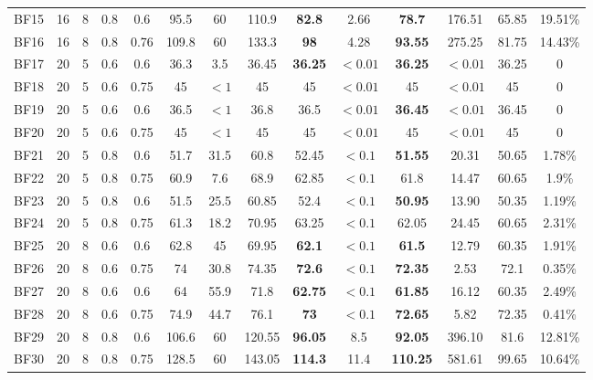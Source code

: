 \documentclass[review,3p,times,authoryear,12pt]{elsarticle}
\begin{document}
\begin{table}[htbp]
\begin{tabular}{c|c|c|c|c|c|c|c|c|c|c|c|c|c}
    BF15  & 16 & 8  & 0.8 & 0.6  & 95.5  & 60    & 110.9  & \textbf{82.8} & 2.66    & \textbf{78.7}  & 176.51  & 65.85 & 19.51\%\\
    BF16  & 16 & 8  & 0.8 & 0.76 & 109.8 & 60    & 133.3  & \textbf{98}   & 4.28    & \textbf{93.55} & 275.25  & 81.75 & 14.43\%\\
    BF17  & 20 & 5  & 0.6 & 0.6  & 36.3  & 3.5   & 36.45  & \textbf{36.25}& $<0.01$ & \textbf{36.25} & $<0.01$ & 36.25 & 0\\
    BF18  & 20 & 5  & 0.6 & 0.75 & 45    & $<1$  & 45     & 45            & $<0.01$ & 45             & $<0.01$ & 45    & 0\\
    BF19  & 20 & 5  & 0.6 & 0.6  & 36.5  & $<1$  & 36.8   & 36.5          & $<0.01$ & \textbf{36.45} & $<0.01$ & 36.45 & 0\\
    BF20  & 20 & 5  & 0.6 & 0.75 & 45    & $<1$  & 45     & 45            & $<0.01$ & 45             & $<0.01$ & 45    & 0\\
    BF21  & 20 & 5  & 0.8 & 0.6  & 51.7  & 31.5  & 60.8   & 52.45         & $<0.1$  & \textbf{51.55} & 20.31   & 50.65 & 1.78\%\\
    BF22  & 20 & 5  & 0.8 & 0.75 & 60.9  & 7.6   & 68.9   & 62.85         & $<0.1$  & 61.8           & 14.47   & 60.65 & 1.9\%\\
    BF23  & 20 & 5  & 0.8 & 0.6  & 51.5  & 25.5  & 60.85  & 52.4          & $<0.1$  & \textbf{50.95} & 13.90   & 50.35 & 1.19\%\\
    BF24  & 20 & 5  & 0.8 & 0.75 & 61.3  & 18.2  & 70.95  & 63.25         & $<0.1$  & 62.05          & 24.45   & 60.65 & 2.31\%\\
    BF25  & 20 & 8  & 0.6 & 0.6  & 62.8  & 45    & 69.95  & \textbf{62.1} & $<0.1$  & \textbf{61.5}  & 12.79   & 60.35 & 1.91\%\\
    BF26  & 20 & 8  & 0.6 & 0.75 & 74    & 30.8  & 74.35  & \textbf{72.6} & $<0.1$  & \textbf{72.35} & 2.53    & 72.1  & 0.35\%\\
    BF27  & 20 & 8  & 0.6 & 0.6  & 64    & 55.9  & 71.8   & \textbf{62.75}& $<0.1$  & \textbf{61.85} & 16.12   & 60.35 & 2.49\%\\
    BF28& 20 & 8  & 0.6 & 0.75 & 74.9  & 44.7  & 76.1   & \textbf{73}   & $<0.1$  & \textbf{72.65} & 5.82    & 72.35 & 0.41\%\\
    BF29  & 20 & 8  & 0.8 & 0.6  & 106.6 & 60    & 120.55 & \textbf{96.05}& 8.5     & \textbf{92.05} & 396.10  & 81.6  & 12.81\%\\
    BF30  & 20 & 8  & 0.8 & 0.75 & 128.5 & 60    & 143.05 &\textbf{ 114.3}& 11.4    & \textbf{110.25}& 581.61  & 99.65 & 10.64\%\\

\end{tabular}
\end{table}
\end{document}
